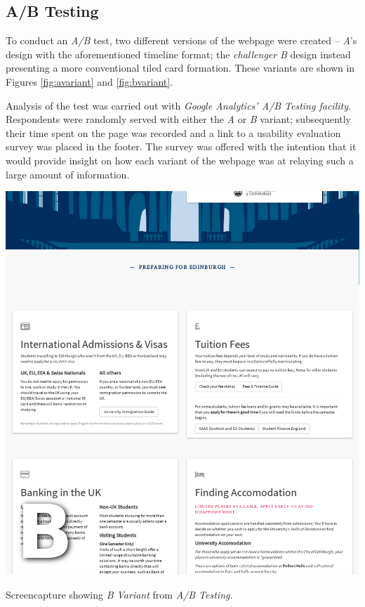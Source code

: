\documentclass[a4paper, notoc]{tufte-handout}
\begin{document}
\subsection{A/B Testing}\label{subsec:a-b-testing}


To conduct an \textit{A/B} test, two different versions of the webpage were created -- 
\textit{A}'s design with the aforementioned timeline format; the \textit{challenger} 
\textit{B} design instead presenting a more conventional tiled card formation. These variants 
are shown in Figures \ref{fig:avariant} and \ref{fig:bvariant}.

Analysis of the test was carried out with \textit{Google Analytics' A/B Testing facility}. 
Respondents were randomly served with either the \textit{A} or \textit{B} variant; subsequently 
their time spent on the page was recorded and a link to a usability evaluation survey was
placed in the footer. The survey was offered with the intention that it would provide insight on how 
each variant of the webpage was at relaying such a large amount of information.

\begin{marginfigure}
  \includegraphics[width=\linewidth]{bvariant.png}
  \caption{
    \label{fig:bvariant}
    Screencapture showing \textit{B Variant} from \textit{A/B Testing}.
  }

\end{marginfigure}
\end{document}
